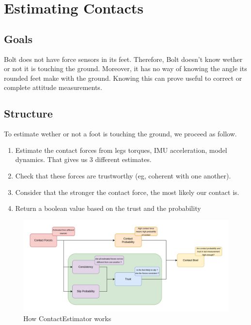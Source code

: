 \documentclass[a4paper,10pt]{article}
\begin{document}
\section{Estimating Contacts}
\subsection{Goals}
Bolt does not have force sensors in its feet. Therefore, Bolt doesn't know wether or not it is touching the ground. Moreover, it has no way of knowing the angle its rounded feet make with the ground. Knowing this can prove useful to correct or complete attitude measurements.

\subsection{Structure}
To estimate wether or not a foot is touching the ground, we proceed as follow.
\begin{enumerate}[noitemsep,topsep=0.5pt,parsep=0.1pt,partopsep=0.1pt]
	\item Estimate the contact forces from legs torques, IMU acceleration, model dynamics. That gives us 3 different estimates.
	\item Check that these forces are trustworthy (eg, coherent with one another).
	\item Consider that the stronger the contact force, the most likely our contact is.
	\item Return a boolean value based on the trust and the probability
\end{enumerate}


\begin{figure}[H]
\label{fig:contact_estimator_structure}
\centering
  \includegraphics[width=\linewidth, angle=0, scale=1.2]{./images/Logique_ContactEstimator.png}
  \caption{How ContactEstimator works}
\end{figure}
\end{document}
